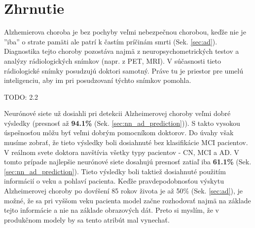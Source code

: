 


\section{Zhrnutie}

Alzhemierova choroba je bez pochyby veľmi nebezpečnou chorobou, keďže nie je ''iba'' o strate pamäti ale patrí k častím príčinám smrti (Sek. \ref{sec:ad}). Diagnostika tejto choroby pozostáva najmä z neuropsychometrických testov a analýzy rádiologických snímkov (napr. z PET, MRI). V súčasnosti tieto rádiologické snímky posudzujú doktori samotný. Práve tu je priestor pre umelú inteligenciu, aby im pri posudzovaní týchto snímkov pomohla.

TODO: 2.2

Neurónové siete už dosiahli pri detekcii Alzheimerovej choroby veľmi dobré výsledky (presnosť až \textbf{94.1\%} (Sek. \ref{sec:nn_ad_prediction})). S takto vysokou úspešnosťou môžu byť veľmi dobrým pomocníkom doktorov. Do úvahy však musíme zobrať, že tieto výsledky boli dosiahnuté bez klasifikácie MCI pacientov. V reálnom svete doktora navštívia všetky typy pacientov - CN, MCI a AD. V tomto prípade najlepšie neurónové siete dosahujú presnosť zatiaľ iba \textbf{61.1\%} (Sek. \ref{sec:nn_ad_prediction}). Tieto výsledky boli taktiež dosiahnuté použitím informácií o veku a pohlaví pacienta. Keďže pravdepodobnosťou výskytu Alzheimerovej choroby po dovŕšení 85 rokov života je až 50\% (Sek. \ref{sec:ad}), je možné, že sa pri vyššom veku pacienta model začne rozhodovať najmä na základe tejto informácie a nie na základe obrazových dát. Preto si myslím, že v produkčnom modely by sa tento atribút mal vynechať. 

